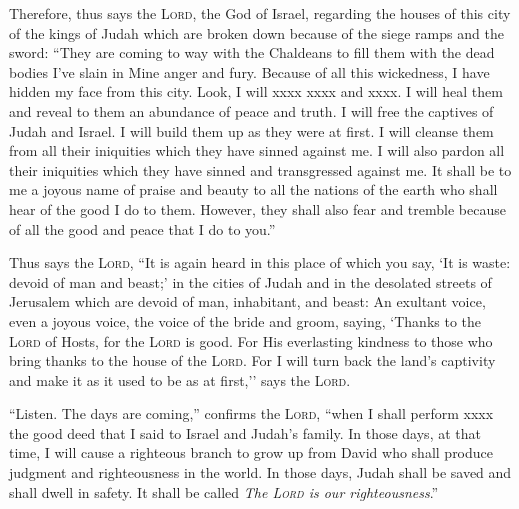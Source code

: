 
\begin{inparaenum}
    
     Therefore, thus says the \textsc{Lord}, the God of Israel, regarding the houses of this city of the kings of Judah which are broken down because of the siege ramps and the sword:%
     ``They are coming to way with the Chaldeans to fill them with the dead bodies I've slain in Mine anger and fury. Because of all this wickedness, I have hidden my face from this city.%
     Look, I will xxxx xxxx and xxxx. I will heal them and reveal to them an abundance of peace and truth.%
     I will free the captives of Judah and Israel. I will build them up as they were at first.%
     I will cleanse them from all their iniquities which they have sinned against me. I will also pardon all their iniquities which they have sinned and transgressed against me.%
     It shall be to me a joyous name of praise and beauty to all the nations of the earth who shall hear of the good I do to them. However, they shall also fear and tremble because of all the good and peace that I do to you.''%
    
     Thus says the \textsc{Lord}, ``It is again heard in this place of which you say, `It is waste: devoid of man and beast;' in the cities of Judah and in the desolated streets of Jerusalem which are devoid of man, inhabitant, and beast:%
     An exultant voice, even a joyous voice, the voice of the bride and groom, saying, `Thanks to the \textsc{Lord} of Hosts, for the \textsc{Lord} is good. For His everlasting kindness to those who bring thanks to the house of the \textsc{Lord}. For I will turn back the land's captivity and make it as it used to be as at first,'' says the \textsc{Lord}.%
    
    
     ``Listen. The days are coming,'' confirms the \textsc{Lord}, ``when I shall perform xxxx the good deed that I said to Israel and Judah's family.%
     In those days, at that time, I will cause a righteous branch to grow up from David who shall produce judgment and righteousness in the world.%
     In those days, Judah shall be saved and shall dwell in safety. It shall be called \textit{The \textsc{Lord} is our righteousness}.''%
    

\end{inparaenum}
